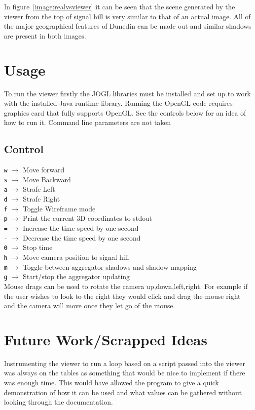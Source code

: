 \documentclass[12pt]{report}
\begin{document}
In figure~\ref{image:realvsviewer} it can be seen that the scene generated by the viewer from the top of signal hill is very similar to that of an actual image. All of the major geographical features of Dunedin can be made out and similar shadows are present in both images.

\section{Usage}
To run the viewer firstly the JOGL libraries must be installed and set up to work with the installed Java runtime library. Running the OpenGL code requires graphics card that fully supports OpenGL. See the controls below for an idea of how to run it. Command line parameters are not taken
\subsection{Control}
\texttt{w} $\rightarrow$ Move forward\\
\texttt{s} $\rightarrow$ Move Backward\\
\texttt{a} $\rightarrow$ Strafe Left\\
\texttt{d} $\rightarrow$ Strafe Right\\
\texttt{f} $\rightarrow$ Toggle Wireframe mode\\
\texttt{p} $\rightarrow$ Print the current 3D coordinates to stdout\\
\texttt{=} $\rightarrow$ Increase the time speed by one second\\
\texttt{-} $\rightarrow$ Decrease the time speed by one second\\
\texttt{0} $\rightarrow$ Stop time\\
\texttt{h} $\rightarrow$ Move camera position to signal hill\\
\texttt{m} $\rightarrow$ Toggle between aggregator shadows and shadow mapping\\
\texttt{g} $\rightarrow$ Start/stop the aggregator updating\\

Mouse drags can be used to rotate the camera up,down,left,right. For example if the user wishes to look to the right they would click and drag the mouse right and the camera will move once they let go of the mouse.

\section{Future Work/Scrapped Ideas}
Instrumenting the viewer to run a loop based on a script passed into the viewer was always on the tables as something that would be nice to implement if there was enough time. This would have allowed the program to give a quick demonstration of how it can be used and what values can be gathered without looking through the documentation.
\end{document}
